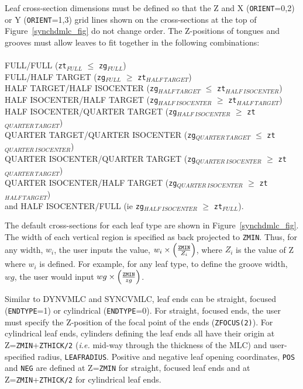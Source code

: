 \documentclass[12pt,twoside]{article}
\begin{document}
Leaf cross-section dimensions must be defined so that the Z and X ({\tt ORIENT}=0,2) or Y ({\tt ORIENT}=1,3) grid lines
shown on the cross-sections at the top of Figure~\ref{synchdmlc_fig} do not change order.
The Z-positions of tongues and grooves must allow leaves to fit
together in the following
combinations:\\~~\\
FULL/FULL ({\tt zt}$_{FULL}$ $\leq$ {\tt zg}$_{FULL}$)\\
FULL/HALF TARGET ({\tt zg}$_{FULL}$ $\geq$ {\tt zt}$_{HALF~TARGET}$)\\
HALF TARGET/HALF ISOCENTER ({\tt zg}$_{HALF~TARGET}$ $\leq$ {\tt zt}$_{HALF~ISOCENTER}$)\\
HALF ISOCENTER/HALF TARGET ({\tt zg}$_{HALF~ISOCENTER}$ $\geq$ {\tt zt}$_{HALF~TARGET}$)\\
HALF ISOCENTER/QUARTER TARGET ({\tt zg}$_{HALF~ISOCENTER}$ $\geq$ {\tt zt}$_{QUARTER~TARGET}$)\\
QUARTER TARGET/QUARTER ISOCENTER ({\tt zg}$_{QUARTER~TARGET}$ $\leq$ {\tt zt}$_{QUARTER~ISOCENTER}$)\\
QUARTER ISOCENTER/QUARTER TARGET ({\tt zg}$_{QUARTER~ISOCENTER}$ $\geq$ {\tt zt}$_{QUARTER~TARGET}$)\\
QUARTER ISOCENTER/HALF TARGET ({\tt zg}$_{QUARTER~ISOCENTER}$ $\geq$ {\tt zt}$_{HALF~TARGET}$)\\
and HALF ISOCENTER/FULL (ie {\tt zg}$_{HALF~ISOCENTER}$ $\geq$ {\tt zt}$_{FULL}$).

The default cross-sections for each leaf type are shown in Figure~\ref{synchdmlc_fig}.  The width of
each vertical region is specified as back projected to {\tt ZMIN}.  Thus, for any width, $w_i$,
the user inputs the value, $w_i\times\left(\frac{{\tt ZMIN}}{Z_i}\right)$, where $Z_i$ is the value of Z
where $w_i$ is defined.  For example, for any leaf type, to define the groove width, $wg$, 
the user would input $wg\times\left(\frac{{\tt ZMIN}}{zg}\right)$.

Similar to DYNVMLC and SYNCVMLC, leaf ends can be straight, focused ({\tt ENDTYPE}=1) or cylindrical
({\tt ENDTYPE}=0).  For straight, focused ends, the user must specify the Z-position of the
focal point of the ends ({\tt ZFOCUS(2)}).  For cylindrical leaf ends, cylinders defining the leaf
ends all have their origin at Z={\tt ZMIN}+{\tt ZTHICK/2} ({\it i.e.} mid-way through the thickness
of the MLC) and user-specified radius, {\tt LEAFRADIUS}.  Positive and negative leaf opening coordinates, {\tt POS} and {\tt NEG}
are defined at Z={\tt ZMIN} for straight, focused leaf ends and at Z={\tt ZMIN}+{\tt ZTHICK/2} for cylindrical
leaf ends.
\end{document}
